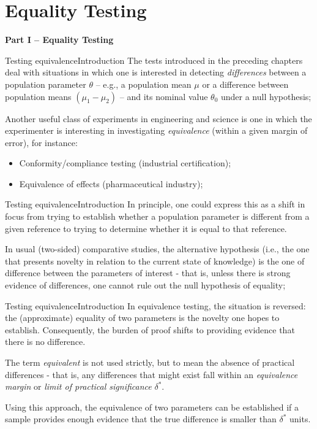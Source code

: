 \section{Equality Testing}

\begin{frame}

  \begin{center}
    {\bf Part I -- Equality Testing}
  \end{center}

\end{frame}

\begin{frame}{Testing equivalence}{Introduction}
The tests introduced in the preceding chapters deal with situations in which one is interested in detecting \textit{differences} between a population parameter $\theta$ -- e.g., a population mean $\mu$ or a difference between population means $(\mu_1-\mu_2)$ -- and its nominal value $\theta_0$ under a null hypothesis;
\bigskip

Another useful class of experiments in engineering and science is one in which the experimenter is interesting in investigating \textit{equivalence} (within a given margin of error), for instance:

\begin{itemize}
  \item Conformity/compliance testing (industrial certification);
  \item Equivalence of effects (pharmaceutical industry);
\end{itemize}
\end{frame}

\begin{frame}{Testing equivalence}{Introduction}
In principle, one could express this as a shift in focus from trying to establish whether a population parameter is different from a given reference to trying to determine whether it is equal to that reference.
\bigskip

In usual (two-sided) comparative studies, the alternative hypothesis (i.e., the one that presents novelty in relation to the current state of knowledge) is the one of difference between the parameters of interest - that is, unless there is strong evidence of differences, one cannot rule out the null hypothesis of equality;
\end{frame}

\begin{frame}{Testing equivalence}{Introduction}
In equivalence testing, the situation is reversed: the (approximate) equality of two parameters is the novelty one hopes to establish. Consequently, the burden of proof shifts to providing evidence that there is no difference.
\bigskip

The term \textit{equivalent} is not used strictly, but to mean the absence of practical differences - that is, any differences that might exist fall within an \textit{equivalence margin} or \textit{limit of practical significance} $\delta^*$.
\bigskip

Using this approach, the equivalence of two parameters can be established if a sample provides enough evidence that the true difference is smaller than $\delta^*$ units.
\end{frame}

